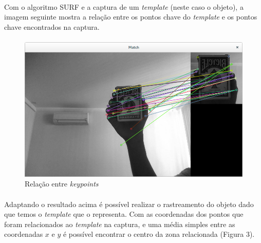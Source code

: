 \documentclass[conference, harvard, brazil, english]{sbatex}
\begin{document}
			\paragraph{}
			Com o algoritmo SURF e a captura de um \textit{template} (neste caso o objeto), a imagem seguinte mostra a relação entre os pontos chave do \textit{template} e os pontos chave encontrados na captura.
			\paragraph{}
			\begin{figure}[h]
				\includegraphics[scale=0.25]{drawmatches}
				\caption{Relação entre \textit{keypoints}}
			\end{figure}
			
			\paragraph{}
			Adaptando o resultado acima é possível realizar o rastreamento do objeto dado que temos o \textit{template} que o representa. Com as coordenadas dos pontos que foram relacionados ao \textit{template} na captura, e uma média simples entre as coordenadas $x$ e $y$ é possível encontrar o centro da zona relacionada (Figura 3).
\end{document}
